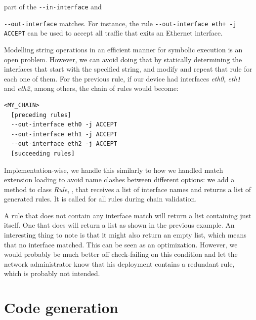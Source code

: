 part of the \lstinline{--in-interface} and {\lstinline{--out-interface}
matches.  For instance, the rule \lstinline{--out-interface eth+ -j ACCEPT} can
be used to accept all traffic that exits an Ethernet interface.

Modelling string operations in an efficient manner for symbolic execution is an
open problem.  However, we can avoid doing that by statically determining the
interfaces that start with the specified string, and modify and repeat that
rule for each one of them.  For the previous rule, if our device had
interfaces \emph{eth0}, \emph{eth1} and \emph{eth2}, among others, the chain of
rules would become:

\begin{listing}
  \lstset{numbers=none, frame=single, basicstyle=\ttfamily,
    xleftmargin=0.25\textwidth, xrightmargin=0.25\textwidth
  }
  \small
  \begin{lstlisting}
<MY_CHAIN>
  [preceding rules]
  --out-interface eth0 -j ACCEPT
  --out-interface eth1 -j ACCEPT
  --out-interface eth2 -j ACCEPT
  [succeeding rules]
  \end{lstlisting}
\end{listing}

Implementation-wise, we handle this similarly to how we handled match extension
loading to avoid name clashes between different options: we add a method to
class \emph{Rule}, , that
receives a list of interface names and returns a list of generated rules.  It
is called for all rules during chain validation.

A rule that does not contain any interface match will return a list containing
just itself.  One that does will return a list as shown in the previous
example.  An interesting thing to note is that it might also return an empty
list, which means that no interface matched.  This can be seen as an
optimization.  However, we would probably be much better off check-failing on
this condition and let the network administrator know that his deployment
contains a redundant rule, which is probably not intended.


\section{Code generation}\label{sec:codegen}

}
